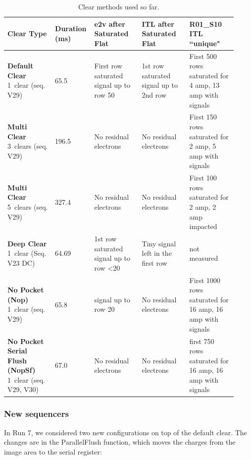 {\tiny
\begin{longtable}{|p{0.2\linewidth}|p{0.12\linewidth}|p{0.2\linewidth}|p{0.2\linewidth}|p{0.2\linewidth}|}
\caption{Clear methods used so far. \label{tab:clears}} \\
\hline
\textbf{Clear Type} & \textbf{Duration (ms)} & \textbf{e2v after Saturated Flat} & \textbf{ITL after Saturated Flat} & \textbf{R01\_S10 ITL ``unique"} \\
\hline
\endfirsthead

\endhead

\hline
\endfoot

\hline
\endlastfoot

\textbf{Default Clear} 1~clear (seq. V29) & 65.5 & First row saturated signal up to row 50 & 1st row saturated signal up to 2nd row & First 500 rows saturated for 4 amp, 13 amp with signals \\
\textbf{Multi Clear} 3~clears (seq. V29) & 196.5 & No residual electrons & No residual electrons & First 150 rows saturated for 2 amp, 5 amp with signals \\
\textbf{Multi Clear} 5~clears (seq. V29) & 327.4 & No residual electrons & No residual electrons & First 100 rows saturated for 2 amp, 2 amp impacted \\
\textbf{Deep Clear} 1~clear (Seq. V23 DC) & 64.69 & 1st row saturated signal up to row <20 & Tiny signal left in the first row & not measured \\
\textbf{No Pocket (Nop)} 1~clear (seq. V29) & 65.8 & signal up to row 20 & No residual electrons & First 1000 rows saturated for 16 amp, 16 amp with signals \\
\textbf{No Pocket Serial Flush (NopSf)} 1~clear (seq. V29, V30) & 67.0 & No residual electrons & No residual electrons & first 750 rows saturated for 16 amp, 16 amp with signals \\
\end{longtable}
}

\subsubsection{New sequencers}\label{new-sequencers}
In Run 7, we considered two new configurations on top of the default clear. The changes are in the ParallelFlush function, which
moves the charges from the image area to the serial register:

